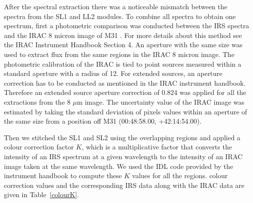 After the spectral extraction there was a noticeable mismatch between the spectra from the SL1 and LL2 modules. To combine all spectra to obtain one spectrum, 
first a photometric comparison was conducted between the IRS spectra and the IRAC 8 micron image of M31 \citep{Barmby2006lr}. For more details 
about this method see the IRAC Instrument Handbook Section 4. An aperture with the same size was used to extract flux from the same regions 
in the IRAC 8 micron image. The photometric calibration of the IRAC is tied to point sources measured within a standard aperture with a radius of 12\arcsec. 
For extended sources,  an aperture correction has to be conducted as mentioned in the IRAC instrument handbook. Therefore an extended source 
aperture correction of 0.824 was applied for all the extractions from the 8 $\mu$m image. The uncertainty value of the IRAC image was estimated 
by taking the standard deviation of pixels values within an aperture of the same size from a position off M31 (00:48:58.00, +42:14:54.00).

Then we stitched the SL1 and SL2 using the overlapping regions and applied a colour correction factor $K$, which is a multiplicative factor that 
converts the intensity of an IRS spectrum at a given wavelength to the intensity of an IRAC image taken at the same wavelength. We used the IDL 
code provided by the instrument handbook to compute these $K$ values for all the regions. colour correction values and the corresponding IRS 
data along with the IRAC data are given in Table~\ref{colourK}.

%

